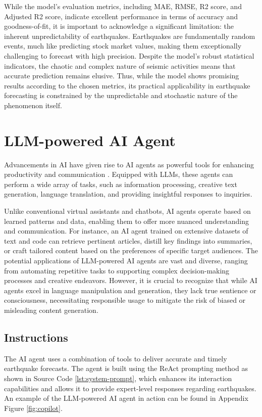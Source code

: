 While the model's evaluation metrics, including \ac{MAE}, \ac{RMSE}, R2 score,
and Adjusted R2 score,
indicate excellent performance in terms of accuracy and goodness-of-fit,
it is important to acknowledge a significant limitation: the inherent
unpredictability of earthquakes. Earthquakes are fundamentally random
events, much like predicting stock market values, making them
exceptionally challenging to forecast with high precision. Despite
the model's robust statistical indicators, the chaotic and complex
nature of seismic activities means that accurate prediction remains
elusive. Thus, while the model shows promising results according to
the chosen metrics, its practical applicability in earthquake
forecasting is constrained by the unpredictable and stochastic
nature of the phenomenon itself.

\section{LLM-powered AI Agent}
Advancements in AI have given rise to AI agents as powerful tools
for enhancing productivity and communication \parencite{xi2023rise}.
Equipped with \ac{LLM}s, these agents can perform a wide array of tasks,
such as information processing, creative text generation, language
translation, and providing insightful responses to inquiries.

Unlike conventional virtual assistants and chatbots, AI agents operate
based on learned patterns and data, enabling them to offer more nuanced
understanding and communication. For instance, an AI agent trained on
extensive datasets of text and code can retrieve pertinent articles,
distill key findings into summaries, or craft tailored content based
on the preferences of specific target audiences. The potential
applications of \ac{LLM}-powered AI agents are vast and diverse, ranging
from automating repetitive tasks to supporting complex decision-making
processes and creative endeavors. However, it is crucial to recognize
that while AI agents excel in language manipulation and generation, they
lack true sentience or consciousness, necessitating responsible usage to
mitigate the risk of biased or misleading content generation.

\subsection{Instructions}

The AI agent uses a combination of tools to deliver accurate and timely
earthquake forecasts. The agent is built using the ReAct prompting
\parencite{yao2023reactsynergizingreasoningacting} method as shown in
Source Code \ref{lst:system-prompt}, which enhances its interaction
capabilities and allows it to provide expert-level responses regarding earthquakes.
An example of the \ac{LLM}-powered AI agent in action can be found in Appendix Figure
\ref{fig:copilot}.

